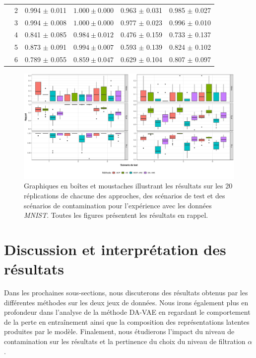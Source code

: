 \begin{table}[h]
\begin{tabular}{|c|c|c c c c|}
		& 2 & 0.994 $\pm$ 0.011 & $\mathbf{1.000 \pm 0.000}$ & 0.963 $\pm$ 0.031 & 0.985 $\pm$ 0.027  \\
		& 3 & 0.994 $\pm$ 0.008 & $\mathbf{1.000 \pm 0.000}$ & 0.977 $\pm$ 0.023 & 0.996 $\pm$ 0.010  \\
		& 4 & 0.841 $\pm$ 0.085 & $\mathbf{0.984 \pm 0.012}$ & 0.476 $\pm$ 0.159 & 0.733 $\pm$ 0.137  \\			
		& 5 & 0.873 $\pm$ 0.091 & $\mathbf{0.994 \pm 0.007}$ & 0.593 $\pm$ 0.139 & 0.824 $\pm$ 0.102  \\
		& 6 & 0.789 $\pm$ 0.055 & $\mathbf{0.859 \pm 0.047}$ & 0.629 $\pm$ 0.104 & 0.807 $\pm$ 0.097  \\
		\midrule
	\end{tabular} 
	\label{tab:recall_mnist}
\end{table}

\begin{figure}[H]
	\centering
	\includegraphics[width=\linewidth]{images/images_boxplots/recall_mnist.pdf}
	\caption[Graphiques en boîtes et moustaches illustrant les résultats de rappel pour les données \textit{MNIST}.]{Graphiques en boîtes et moustaches illustrant les résultats sur les 20 réplications de chacune des approches, des scénarios de test et des scénarios de contamination pour l'expérience avec les données \textit{MNIST}. Toutes les figures présentent les résultats en rappel.}
	\label{fig:recall_mnist}
\end{figure}

\section{Discussion et interprétation des résultats} \label{discussion}

Dans les prochaines sous-sections, nous discuterons des résultats obtenus par les différentes méthodes sur les deux jeux de données. Nous irons également plus en profondeur dans l'analyse de la méthode DA-VAE en regardant le comportement de la perte en entraînement ainsi que la composition des représentations latentes produites par le modèle. Finalement, nous étudierons l'impact du niveau de contamination sur les résultats et la pertinence du choix du niveau de filtration $\alpha$.

